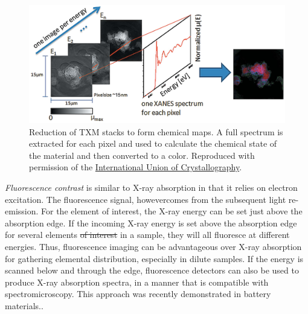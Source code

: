 \documentclass[journal=cmatex,manuscript=perspective]{achemso}
\newcommand{\iucr}{Reproduced with permission of the
  \href{http://journals.iucr.org/}{International Union of
    Crystallography}.}
\providecommand{\DIFaddtex}[1]{{\protect\color{blue}\uwave{#1}}} %
\providecommand{\DIFdeltex}[1]{{\protect\color{red}\sout{#1}}}                      %
\providecommand{\DIFaddbegin}{} %
\providecommand{\DIFaddend}{} %
\providecommand{\DIFdelbegin}{} %
\providecommand{\DIFdelend}{} %
\providecommand{\DIFadd}[1]{\texorpdfstring{\DIFaddtex{#1}}{#1}} %
\providecommand{\DIFdel}[1]{\texorpdfstring{\DIFdeltex{#1}}{}} %
\begin{document}
\begin{figure}
  \includegraphics[width=\textwidth]{meirer2011-2.png}
  \caption{Reduction of TXM stacks to form chemical maps. A full
    spectrum is extracted for each pixel and used to calculate the
    chemical state of the material and then converted to a
    color.\cite{meirer2011} \iucr}
  \label{figure:meirer2011-2}
\end{figure}

\emph{Fluorescence contrast} is similar to X-ray absorption in that it
relies on electron excitation. The fluorescence signal, however\DIFaddbegin \DIFadd{, }\DIFaddend comes
from the subsequent light re-emission. For the element of interest,
the X-ray energy can be set just above the absorption edge. If the
incoming X-ray energy is set above the absorption edge for several
elements \DIFdelbegin \DIFdel{of interest }\DIFdelend in a sample, they will all fluoresce at different
energies. Thus, fluorescence imaging can be advantageous over X-ray
absorption for gathering elemental distribution, especially in dilute
samples. If the energy is scanned below and through the edge,
fluorescence detectors can also be used to produce X-ray absorption
spectra, in a manner that is compatible with spectromicroscopy. This
approach was recently demonstrated in battery
materials.\cite{chueh2015}.
\end{document}
